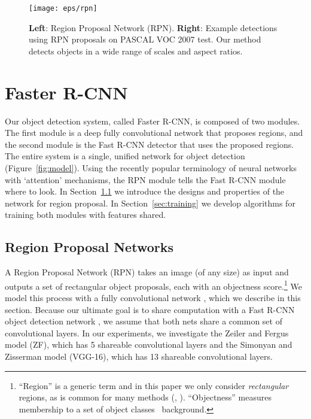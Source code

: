 \documentclass[10pt,journal,cspaper,compsoc]{IEEEtran}
\begin{document}
\begin{figure*}[t]
\centering
\texttt{[image: eps/rpn]}
\caption{\textbf{Left}: Region Proposal Network (RPN). \textbf{Right}: Example detections using RPN proposals on PASCAL VOC 2007 test. Our method detects objects in a wide range of scales and aspect ratios.}
\label{fig:rpn}
\end{figure*}

\section{Faster R-CNN}

Our object detection system, called Faster R-CNN, is composed of two modules. The first module is a deep fully convolutional network that proposes regions, and the second module is the Fast R-CNN detector \cite{Girshick2015a} that uses the proposed regions. The entire system is a single, unified network for object detection (Figure~\ref{fig:model}).
Using the recently popular terminology of neural networks with `attention' \cite{Chorowski2015} mechanisms, the RPN module tells the Fast R-CNN module where to look.
In Section~\ref{sec:rpn} we introduce the designs and properties of the network for region proposal. In Section~\ref{sec:training} we develop algorithms for training both modules with features shared.

\subsection{Region Proposal Networks}
\label{sec:rpn}

A Region Proposal Network (RPN) takes an image (of any size) as input and outputs a set of rectangular object proposals, each with an objectness score.\footnote{``Region'' is a generic term and in this paper we only consider \emph{rectangular} regions, as is common for many methods (\eg, \cite{Szegedy2014a,Uijlings2013,Zitnick2014}). ``Objectness'' measures membership to a set of object classes \vs~background.}
We model this process with a fully convolutional network \cite{Long2015}, which we describe in this section.
Because our ultimate goal is to share computation with a Fast R-CNN object detection network \cite{Girshick2015a}, we assume that both nets share a common set of convolutional layers.
In our experiments, we investigate the Zeiler and Fergus model \cite{Zeiler2014} (ZF), which has 5 shareable convolutional layers and the Simonyan and Zisserman model \cite{Simonyan2015} (VGG-16), which has 13 shareable convolutional layers.
\end{document}
